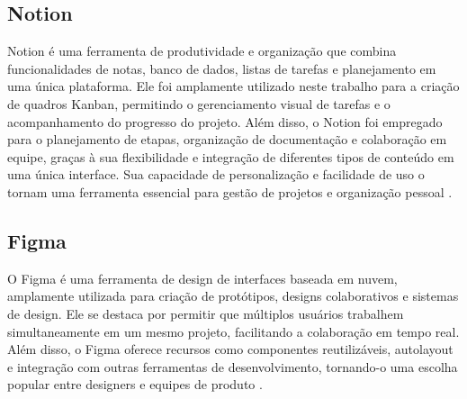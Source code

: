 \subsection{Notion}
 Notion é uma ferramenta de produtividade e organização que combina funcionalidades de notas, banco de dados, listas de tarefas e planejamento em uma única plataforma. Ele foi amplamente utilizado neste trabalho para a criação de quadros \gls{Kanban}, permitindo o gerenciamento visual de tarefas e o acompanhamento do progresso do projeto. Além disso, o Notion foi empregado para o planejamento de etapas, organização de documentação e colaboração em equipe, graças à sua flexibilidade e integração de diferentes tipos de conteúdo em uma única interface. Sua capacidade de personalização e facilidade de uso o tornam uma ferramenta essencial para gestão de projetos e organização pessoal \citep{notion}.

\subsection{Figma}
O Figma é uma ferramenta de design de interfaces baseada em nuvem, amplamente utilizada para criação de protótipos, designs colaborativos e sistemas de design. Ele se destaca por permitir que múltiplos usuários trabalhem simultaneamente em um mesmo projeto, facilitando a colaboração em tempo real. Além disso, o Figma oferece recursos como componentes reutilizáveis, autolayout e integração com outras ferramentas de desenvolvimento, tornando-o uma escolha popular entre designers e equipes de produto \citep{figma}.



